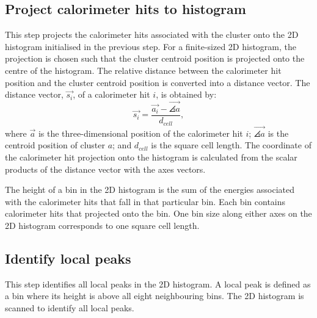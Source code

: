 


\subsection{Project calorimeter hits to histogram}

This step projects the calorimeter hits associated with the cluster onto the 2D histogram initialised in the previous step. For a finite-sized 2D histogram, the projection is chosen such that the cluster centroid position is projected onto the centre of the histogram. The relative distance between the calorimeter hit position and the cluster centroid position is converted into a distance vector. The distance vector, $\vec{s_{i}}$, of a calorimeter hit $i$, is obtained by:
\begin{equation}
\vec{s_{i}} = \frac{\vec{a_{i}} -  \vec{\angles{a}}}{d_{cell}},
\end{equation}
where $\vec{a}$ is the three-dimensional position of the calorimeter hit $i$;  $\vec{\angles{a}}$ is the centroid position of cluster $a$; and $d_{cell}$ is the  \ECAL square cell length. The coordinate of the calorimeter hit projection onto the histogram is calculated from the scalar products of the distance vector with the axes vectors.

The height of a bin in the 2D histogram is the sum of the energies associated with the calorimeter hits that fall in that particular bin. Each bin contains calorimeter hits that projected onto the bin. One bin size along either axes on the 2D histogram corresponds to one \ECAL square cell length.


\subsection{Identify local peaks}

This step identifies all local peaks in the 2D histogram. A local peak is defined as a bin where its height is above all eight neighbouring bins. The 2D histogram is scanned to identify all local peaks. %
